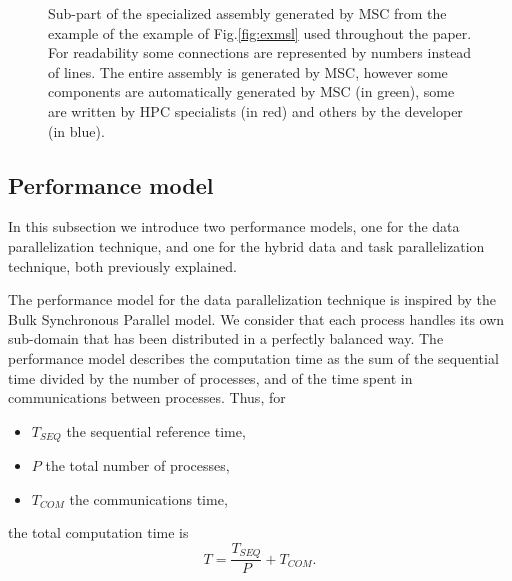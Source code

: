 \begin{figure}[t]
\begin{center}
\vspace*{.5em}
\caption{Sub-part of the specialized assembly generated by MSC from the example of the example of Fig.\ref{fig:exmsl} used throughout the paper. For readability some connections are represented by numbers instead of lines. The entire assembly is generated by MSC, however some components are automatically generated by MSC (in green), some are written by HPC specialists (in red) and others by the developer (in blue).}
\label{fig:specass}
\end{center}
\end{figure}

\subsection{Performance model}
\label{sect:perfs}

In this subsection we introduce two performance models, one for the data parallelization technique, and one for the hybrid data and task parallelization technique, both previously explained.

The performance model for the data parallelization technique is inspired by the Bulk Synchronous Parallel model.
We consider that each process handles its own sub-domain that has been distributed in a perfectly balanced way.
The performance model describes the computation time as the sum of the sequential time divided by the number of processes, and of the time spent in communications between processes. Thus, for
\begin{itemize}
\item $T_{SEQ}$ the sequential reference time, 
\item $P$ the total number of processes, 
\item $T_{COM}$ the communications time, 
\end{itemize}
the total computation time is
\begin{equation}
T = \frac{T_{SEQ}}{P} + T_{COM}.
\end{equation}

